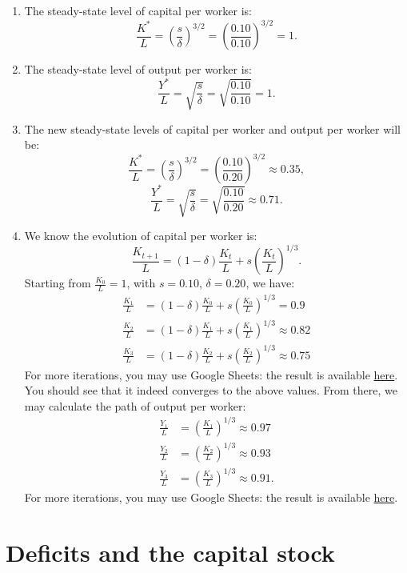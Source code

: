 \documentclass[]{book}
\begin{document}
\begin{enumerate}
\def\labelenumi{\arabic{enumi}.}
\item
  The steady-state level of capital per worker is:
  \[\frac{K^{*}}{L}=\left(\frac{s}{\delta}\right)^{3/2}=\left(\frac{0.10}{0.10}\right)^{3/2}=1.\]
\item
  The steady-state level of output per worker is:
  \[\frac{Y^{*}}{L}=\sqrt{\frac{s}{\delta}}=\sqrt{\frac{0.10}{0.10}}=1.\]
\item
  The new steady-state levels of capital per worker and output per
  worker will be:
  \[\frac{K^{*}}{L}=\left(\frac{s}{\delta}\right)^{3/2}=\left(\frac{0.10}{0.20}\right)^{3/2} \approx 0.35,\]
  \[\frac{Y^{*}}{L}=\sqrt{\frac{s}{\delta}}=\sqrt{\frac{0.10}{0.20}}\approx 0.71.\]
\item
  We know the evolution of capital per worker is:
  \[\frac{K_{t+1}}{L}=(1-\delta)\frac{K_{t}}{L}+s\left(\frac{K_{t}}{L}\right)^{1/3}.\]
  Starting from \(\frac{K_{0}}{L}=1\), with \(s=0.10\), \(\delta=0.20\),
  we have: \[
  \begin{aligned}
  \frac{K_{1}}{L}&=(1-\delta)\frac{K_{0}}{L}+s\left(\frac{K_{0}}{L}\right)^{1/3}=0.9\\
  \frac{K_{2}}{L}&=(1-\delta)\frac{K_{1}}{L}+s\left(\frac{K_{1}}{L}\right)^{1/3} \approx  0.82\\
  \frac{K_{3}}{L}&=(1-\delta)\frac{K_{2}}{L}+s\left(\frac{K_{2}}{L}\right)^{1/3}\approx 0.75
  \end{aligned}
  \] For more iterations, you may use Google Sheets: the result is
  available
  \href{https://docs.google.com/spreadsheets/d/1T81-Dx1iUtzE2zUHV9y1rgwYqTKpno47ZCqC1Kmf2aY/edit?usp=sharing}{here}.
  You should see that it indeed converges to the above values. From
  there, we may calculate the path of output per worker: \[
  \begin{aligned}
  \frac{Y_{1}}{L}&=\left(\frac{K_{1}}{L}\right)^{1/3}\approx 0.97\\
  \frac{Y_{2}}{L}&=\left(\frac{K_{2}}{L}\right)^{1/3} \approx 0.93\\
  \frac{Y_{3}}{L}&=\left(\frac{K_{3}}{L}\right)^{1/3}\approx 0.91.
  \end{aligned}
  \] For more iterations, you may use Google Sheets: the result is
  available
  \href{https://docs.google.com/spreadsheets/d/1T81-Dx1iUtzE2zUHV9y1rgwYqTKpno47ZCqC1Kmf2aY/edit?usp=sharing}{here}.
\end{enumerate}

\section{Deficits and the capital
stock}\label{deficits-and-the-capital-stock-1}
\end{document}
